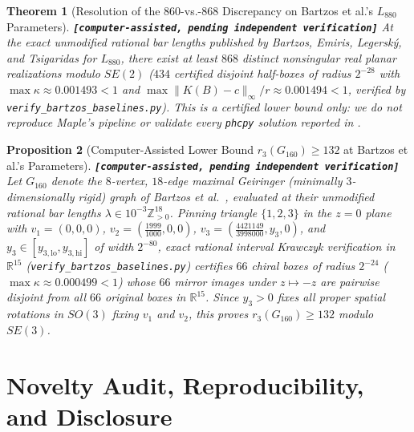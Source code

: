 \documentclass[11pt,a4paper]{article}
\newtheorem{theorem}{Theorem}
\newtheorem{proposition}[theorem]{Proposition}
\theoremstyle{definition}
\theoremstyle{remark}
\newcommand{\claimtag}[1]{\textup{\textbf{\texttt{[#1]}}}}
\begin{document}
\begin{theorem}[Resolution of the $860$-vs.-$868$ Discrepancy on Bartzos et al.'s $L_{880}$ Parameters]
\label{thm:bartzos868}
\claimtag{computer-assisted, pending independent verification} At the exact unmodified rational bar lengths published by Bartzos, Emiris, Legersk\'{y}, and Tsigaridas \cite[p.~16]{BELT18} for $L_{880}$, there exist at least $868$ distinct nonsingular real planar realizations modulo $SE(2)$ ($434$ certified disjoint half-boxes of radius $2^{-28}$ with $\max \kappa \approx 0.001493 < 1$ and $\max \|K(B)-c\|_\infty / r \approx 0.001494 < 1$, verified by \texttt{verify\_bartzos\_baselines.py}). This is a certified lower bound only: we do not reproduce Maple's pipeline or validate every \texttt{phcpy} solution reported in \cite{BELT18}.
\end{theorem}

\begin{proposition}[Computer-Assisted Lower Bound $r_3(G_{160}) \ge 132$ at Bartzos et al.'s Parameters]
\label{prop:g160}
\claimtag{computer-assisted, pending independent verification} Let $G_{160}$ denote the $8$-vertex, $18$-edge maximal Geiringer (minimally $3$-dimensionally rigid) graph of Bartzos et al.\ \cite[p.~19]{BELT18}, evaluated at their unmodified rational bar lengths $\lambda \in 10^{-3}\mathbb{Z}_{>0}^{18}$. Pinning triangle $\{1,2,3\}$ in the $z=0$ plane with $v_1=(0,0,0)$, $v_2=(\frac{1999}{1000},0,0)$, $v_3=(\frac{4421149}{3998000}, y_3, 0)$, and $y_3 \in [y_{3,\mathrm{lo}}, y_{3,\mathrm{hi}}]$ of width $2^{-80}$, exact rational interval Krawczyk verification in $\mathbb{R}^{15}$ (\texttt{verify\_bartzos\_baselines.py}) certifies $66$ chiral boxes of radius $2^{-24}$ ($\max \kappa \approx 0.000499 < 1$) whose $66$ mirror images under $z \mapsto -z$ are pairwise disjoint from all $66$ original boxes in $\mathbb{R}^{15}$. Since $y_3 > 0$ fixes all proper spatial rotations in $SO(3)$ fixing $v_1$ and $v_2$, this proves $r_3(G_{160}) \ge 132$ modulo $SE(3)$.
\end{proposition}

\section{Novelty Audit, Reproducibility, and Disclosure}
\end{document}
